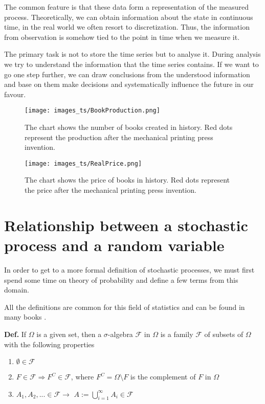 \documentclass[thesis=M,english]{FITthesis}[2019/12/23]
\begin{document}
The common feature is that these data form a representation of the measured process. Theoretically, we can obtain information about the state in continuous time, in the real world we often resort to discretization. Thus, the information from observation is somehow tied to the point in time when we measure it.

The primary task is not to store the time series but to analyse it. During analysis we try to understand the information that the time series contains. If we want to go one step further, we can draw conclusions from the understood information and base on them make decisions and systematically influence the future in our favour.

\begin{figure}[ht!]
    \centering
    \texttt{[image: images\_ts/BookProduction.png]}
    \caption{The chart shows the number of books created in history. Red dots represent the production after the mechanical printing press invention.} 
    \label{fig:bookProduction}
\end{figure}

\begin{figure}[ht!]
    \centering
    \texttt{[image: images\_ts/RealPrice.png]}
    \caption{The chart shows the price of books in history. Red dots represent the price after the mechanical printing press invention.}
    \label{fig:bookPrice}
    
\end{figure}


\clearpage
\section{Relationship between a stochastic process and a random variable}
In order to get to a more formal definition of stochastic processes, we must first spend some time on theory of probability and define a few terms from this domain.

All the definitions are common for this field of statistics and can be found in many books \cite{time_series_theory}.

\textbf{Def.} If $\Omega$ is a given set, then a $\sigma$-algebra $\mathcal{F}$ in $\Omega$ is a family $\mathcal{F}$ of subsets of $\Omega$ with the following properties
\begin{enumerate}[label=(\roman*)]
\item $\emptyset \in \mathcal{F}$
\item $F \in \mathcal{F} \Rightarrow F^C \in \mathcal{F}$, where $F^C = \Omega \setminus F$ is the complement of $F$ in $\Omega$
\item $A_1,A_2,... \in \mathcal{F} \longrightarrow$ $A:= \bigcup_{i=1}^{\infty} A_i \in \mathcal{F}$
\end{enumerate}
\end{document}
